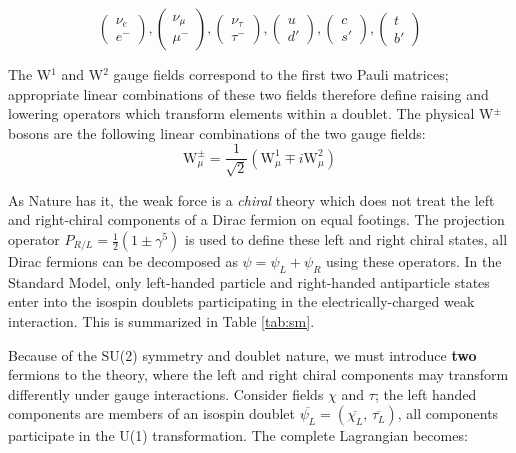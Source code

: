 \begin{equation*}
\begin{pmatrix} \nu_{e} \\ e^{-} \end{pmatrix},
\begin{pmatrix} \nu_{\mu} \\ \mu^{-} \end{pmatrix},
\begin{pmatrix} \nu_{\tau} \\ \tau^{-} \end{pmatrix},
\begin{pmatrix} u \\ d' \end{pmatrix},
\begin{pmatrix} c \\ s' \end{pmatrix},
\begin{pmatrix} t \\ b' \end{pmatrix}
\end{equation*}

The W$^{1}$ and W$^{2}$ gauge fields correspond to the first two Pauli matrices; appropriate linear combinations of these two fields therefore define raising and lowering operators which transform elements within a doublet. The physical W$^{\pm}$ bosons are the following linear combinations of the two gauge fields:
\begin{equation}
\mathrm{W}_{\mu}^{\pm} = \frac{1}{\sqrt{2}} ( \mathrm{W}^{1}_{\mu} \mp i\mathrm{W}_{\mu}^{2})
\end{equation}

As Nature has it, the weak force is a \textit{chiral} theory which does not treat the left and right-chiral components of a Dirac fermion on equal footings.  The projection operator $P_{R/L} = \frac{1}{2} ( 1 \pm \gamma^{5})$ is used to define these left and right chiral states, all Dirac fermions can be decomposed as $\psi = \psi_{L} + \psi_{R}$ using these operators. In the Standard Model, only left-handed particle and right-handed antiparticle states enter into the isospin doublets participating in the electrically-charged weak interaction. This is summarized in Table \ref{tab:sm}.

Because of the SU(2) symmetry and doublet nature, we must introduce \textbf{two} fermions to the theory, where the left and right chiral components may transform differently under gauge interactions. Consider fields  $\chi$ and  $\tau$; the left handed components are members of an isospin doublet $\overline{\psi_{L}}=(\overline{\chi_{L}},\,\overline{\tau_{L}})$, all components participate in the U(1) transformation. The complete Lagrangian becomes:

